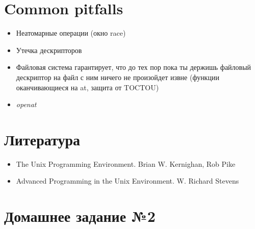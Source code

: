 \documentclass[../../lectures.tex]{subfiles}
\begin{document}
\section{Common pitfalls}
\begin{itemize}
    \item Неатомарные операции (окно race)
    \item Утечка дескрипторов
    \item Файловая система гарантирует, что до тех пор пока 
          ты держишь файловый дескриптор на файл с ним ничего 
          не произойдет извне (функции оканчивающиеся на at, 
          защита от TOCTOU)
    \item \emph{openat}
\end{itemize}

\section{Литература}
\begin{itemize}
    \item The Unix Programming Environment. Brian W. Kernighan, Rob Pike
    \item Advanced Programming in the Unix Environment. W. Richard Stevens
\end{itemize}

\section{Домашнее задание №2}
\end{document}
